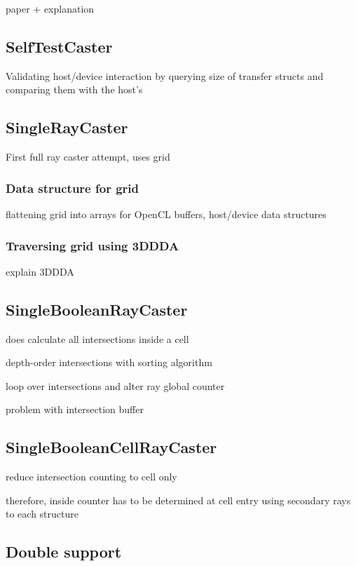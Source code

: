 paper + explanation

\subsection{SelfTestCaster}

Validating host/device interaction by querying size of transfer structs and comparing them with the host's

\subsection{SingleRayCaster}

First full ray caster attempt, uses grid

\subsubsection{Data structure for grid}

flattening grid into arrays for OpenCL buffers, host/device data structures

\subsubsection{Traversing grid using 3DDDA}

explain 3DDDA

\subsection{SingleBooleanRayCaster}

does calculate all intersections inside a cell

depth-order intersections with sorting algorithm

loop over intersections and alter ray global counter

problem with intersection buffer

\subsection{SingleBooleanCellRayCaster}

reduce intersection counting to cell only

therefore, inside counter has to be determined at cell entry using secondary rays to each structure

\subsection{Double support}

